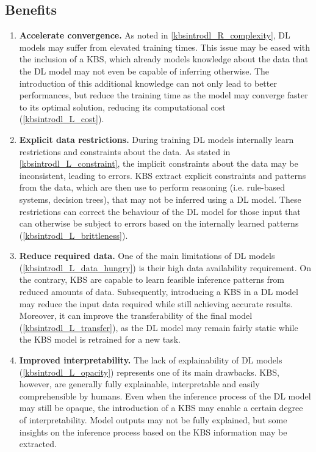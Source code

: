 \subsection{Benefits}
\begin{enumerate} [start=1,label={\bfseries B\arabic*.}]
    \item \label{kbsintrodl_B_convergence} \textbf{Accelerate convergence.} As noted in \ref{kbsintrodl_R_complexity}, DL models may suffer from elevated training times. This issue may be eased with the inclusion of a KBS, which already models knowledge about the data that the DL model may not even be capable of inferring otherwise. The introduction of this additional knowledge can not only lead to better performances, but reduce the training time as the model may converge faster to its optimal solution, reducing its computational cost (\ref{kbsintrodl_L_cost}).
    
    \item \label{kbsintrodl_B_restrictions} \textbf{Explicit data restrictions.} During training DL models internally learn restrictions and constraints about the data. As stated in \ref{kbsintrodl_L_constraint}, the implicit constraints about the data may be inconsistent, leading to errors. KBS extract explicit constraints and patterns from the data, which are then use to perform reasoning (i.e. rule-based systems, decision trees), that may not be inferred using a DL model. These restrictions can correct the behaviour of the DL model for those input that can otherwise be subject to errors based on the internally learned patterns (\ref{kbsintrodl_L_brittleness}). 
    
    \item \label{kbsintrodl_B_reduce} \textbf{Reduce required data.} One of the main limitations of DL models (\ref{kbsintrodl_L_data_hungry}) is their high data availability requirement. On the contrary, KBS are capable to learn feasible inference patterns from reduced amounts of data. Subsequently, introducing a KBS in a DL model may reduce the input data required while still achieving accurate results. Moreover, it can improve the transferability of the final model (\ref{kbsintrodl_L_transfer}), as the DL model may remain fairly static while the KBS model is retrained for a new task. 
    
    \item \label{kbsintrodl_B_interpretability} \textbf{Improved interpretability.} The lack of explainability of DL models (\ref{kbsintrodl_L_opacity}) represents one of its main drawbacks. KBS, however, are generally fully explainable, interpretable and easily comprehensible by humans. Even when the inference process of the DL model may still be opaque, the introduction of a KBS may enable a certain degree of interpretability. Model outputs may not be fully explained, but some insights on the inference process based on the KBS information may be extracted.
    
\end{enumerate}

